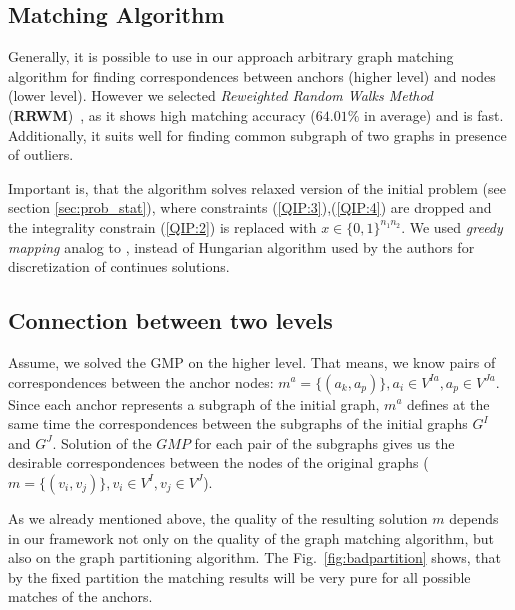 \subsection{Matching Algorithm}

Generally, it is possible to use in our approach arbitrary graph matching algorithm for finding correspondences between anchors (higher level) and nodes (lower level). However we selected \emph{Reweighted Random Walks Method} (\textbf{RRWM})~\cite{Cho2010_RRWM}, as it shows high matching accuracy ($64.01\%$ in average) and is fast. Additionally, it	 suits well for finding common subgraph of two graphs in presence of outliers.

Important is, that the algorithm solves relaxed version of the initial problem (see section \ref{sec:prob_stat}), where constraints (\ref{QIP:3}),(\ref{QIP:4}) are dropped and the integrality constrain (\ref{QIP:2}) is replaced with $x\in \{0,1\}^{n_1n_2}$. We used \emph{greedy mapping} analog to \cite{Leordeanu2005}, instead of Hungarian algorithm used by the authors for discretization of continues solutions.

\subsection{Connection between two levels}
Assume, we solved the GMP on the higher level. That means, we know pairs of correspondences between the anchor nodes: $m^a = \{(a_k, a_p)\}, a_i\in V^{Ia}, a_p\in V^{Ja}$. Since each anchor represents a subgraph of the initial graph, $m^a$ defines at the same time the correspondences between the subgraphs of the initial graphs $G^I$ and $G^J$. Solution of the $GMP$ for each pair of the subgraphs gives us the desirable correspondences between the nodes of the original graphs ($m = \{(v_i, v_j)\}, v_i\in V^{I}, v_j\in V^{J}$).

As we already mentioned above, the quality of the resulting solution $m$ depends in our framework not only on the quality of the graph matching algorithm, but also on the graph partitioning algorithm. The Fig.~\ref{fig:badpartition} shows, that by the fixed partition the matching results will be very pure for all possible matches of the anchors.

